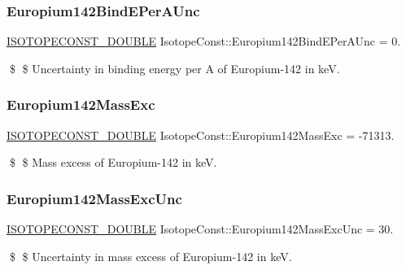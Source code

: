 \subsubsection{\texorpdfstring{Europium142\+Bind\+E\+Per\+A\+Unc}{Europium142BindEPerAUnc}}
{\footnotesize\ttfamily \mbox{\hyperlink{group___isotope_const-_macros_ga8f45a7272ce02c0b4c65c44636ed719a}{I\+S\+O\+T\+O\+P\+E\+C\+O\+N\+S\+T\+\_\+\+D\+O\+U\+B\+LE}} Isotope\+Const\+::\+Europium142\+Bind\+E\+Per\+A\+Unc = 0.}

\$ \$ Uncertainty in binding energy per A of Europium-\/142 in keV. \mbox{\label{group___isotope_const-_europium-_eu142_ga39f5b39ba1369d37ac1176b0777d9b10}} 
\subsubsection{\texorpdfstring{Europium142\+Mass\+Exc}{Europium142MassExc}}
{\footnotesize\ttfamily \mbox{\hyperlink{group___isotope_const-_macros_ga8f45a7272ce02c0b4c65c44636ed719a}{I\+S\+O\+T\+O\+P\+E\+C\+O\+N\+S\+T\+\_\+\+D\+O\+U\+B\+LE}} Isotope\+Const\+::\+Europium142\+Mass\+Exc = -\/71313.}

\$ \$ Mass excess of Europium-\/142 in keV. \mbox{\label{group___isotope_const-_europium-_eu142_ga1e5456add7043cd37eb1a8893b965710}} 
\subsubsection{\texorpdfstring{Europium142\+Mass\+Exc\+Unc}{Europium142MassExcUnc}}
{\footnotesize\ttfamily \mbox{\hyperlink{group___isotope_const-_macros_ga8f45a7272ce02c0b4c65c44636ed719a}{I\+S\+O\+T\+O\+P\+E\+C\+O\+N\+S\+T\+\_\+\+D\+O\+U\+B\+LE}} Isotope\+Const\+::\+Europium142\+Mass\+Exc\+Unc = 30.}

\$ \$ Uncertainty in mass excess of Europium-\/142 in keV. \mbox{\label{group___isotope_const-_europium-_eu142_gaae2d54c3364031b3f31add79a14a009b}} 
